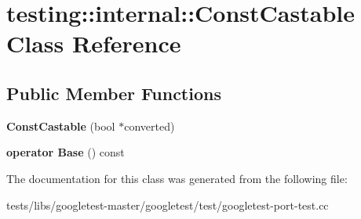 \hypertarget{classtesting_1_1internal_1_1ConstCastable}{}\section{testing\+:\+:internal\+:\+:Const\+Castable Class Reference}
\label{classtesting_1_1internal_1_1ConstCastable}
\subsection*{Public Member Functions}
\begin{DoxyCompactItemize}
\item 
\mbox{\label{classtesting_1_1internal_1_1ConstCastable_a78eba470cc71528237a33a10a92fba7e}} 
{\bfseries Const\+Castable} (bool $\ast$converted)
\item 
\mbox{\label{classtesting_1_1internal_1_1ConstCastable_af084893d6786010022297b1e88f4743b}} 
{\bfseries operator Base} () const
\end{DoxyCompactItemize}


The documentation for this class was generated from the following file\+:\begin{DoxyCompactItemize}
\item 
tests/libs/googletest-\/master/googletest/test/googletest-\/port-\/test.\+cc\end{DoxyCompactItemize}
